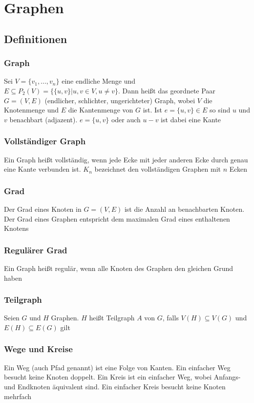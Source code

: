 \section{Graphen}
	\subsection{Definitionen}
	\subsubsection{Graph}
		Sei $V=\{v_1,...,v_n\}$ eine endliche Menge und $E\subseteq P_2(V)=\{\{u,v\}|u,v\in V,u\not = v\}$. Dann heißt das geordnete Paar $G=(V,E)$ (endlicher, schlichter, ungerichteter) Graph, wobei $V$ die Knotenmenge und $E$ die Kantenmenge von $G$ ist. Ist $e=\{u,v\}\in E$ so sind $u$ und $v$ benachbart (adjazent). $e=\{u,v\}$ oder auch $u-v$ ist dabei eine Kante 
	\subsubsection{Vollständiger Graph}
		Ein Graph heißt vollständig, wenn jede Ecke mit jeder anderen Ecke durch genau eine Kante verbunden ist. $K_n$ bezeichnet den vollständigen Graphen mit $n$ Ecken
	\subsubsection{Grad}
		Der Grad eines Knoten in $G=(V,E)$ ist die Anzahl an benachbarten Knoten. Der Grad eines Graphen entspricht dem maximalen Grad eines enthaltenen Knotens
	\subsubsection{Regulärer Grad}
		Ein Graph heißt regulär, wenn alle Knoten des Graphen den gleichen Grund haben
	\subsubsection{Teilgraph}
		Seien $G$ und $H$ Graphen. $H$ heißt Teilgraph $A$ von $G$, falls $V(H)\subseteq V(G)$ und $E(H)\subseteq E(G)$ gilt
	\subsubsection{Wege und Kreise}
		Ein Weg (auch Pfad genannt) ist eine Folge von Kanten. Ein einfacher Weg besucht keine Knoten doppelt. Ein Kreis ist ein einfacher Weg, wobei Anfangs- und Endknoten äquivalent sind. Ein einfacher Kreis besucht keine Knoten mehrfach
